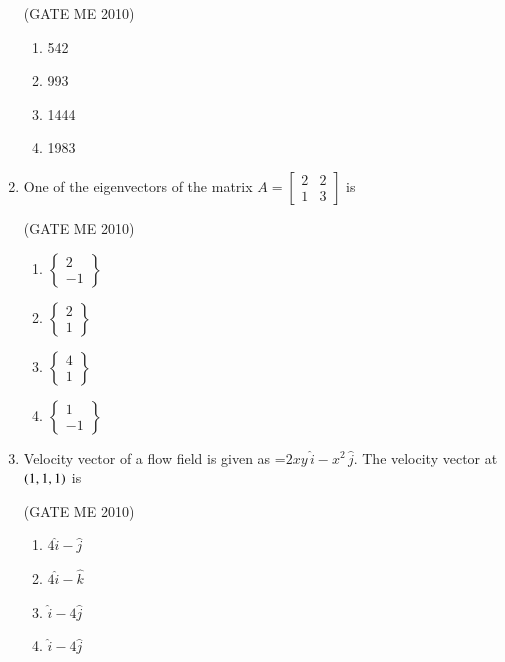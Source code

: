 \documentclass[journal,12pt,onecolumn]{IEEEtran}
\theoremstyle{remark}
\begin{document}
\begin{enumerate}
  \hfill{(GATE ME 2010)}\\


\begin{multicols}{4}
\begin{enumerate}
    
    \item 542
    \item 993
    \item 1444
    \item 1983
\end{enumerate}
\end{multicols}


\item One of the eigenvectors of the matrix
\( A = \begin{bmatrix} 2 & 2 \\ 1 & 3 \end{bmatrix} \) is

  \hfill{(GATE ME 2010)}\\
  
\begin{multicols}{4}
\begin{enumerate}

    \item \( \begin{Bmatrix} 2 \\ -1 \end{Bmatrix} \)
    \item \( \begin{Bmatrix} 2 \\ 1 \end{Bmatrix} \)
    \item \( \begin{Bmatrix} 4 \\ 1 \end{Bmatrix} \)
    \item \( \begin{Bmatrix} 1 \\ -1 \end{Bmatrix} \)
\end{enumerate}
\end{multicols}




\item Velocity vector of a flow field is given as   =$2xy\,\hat{i} - x^2\,\hat{j}$.
The velocity vector at $\left(1,1,1\right)$ is

  \hfill{(GATE ME 2010)}\\

\begin{multicols}{2}
\begin{enumerate}
    \item $4\hat{i}-\hat{j}$
    \item $4\hat{i}-\hat{k}$
    \item $\hat{i}-4\hat{j}$
    \item $\hat{i}-4\hat{j}$
\end{enumerate}
\end{multicols}



\end{enumerate}
\end{document}
